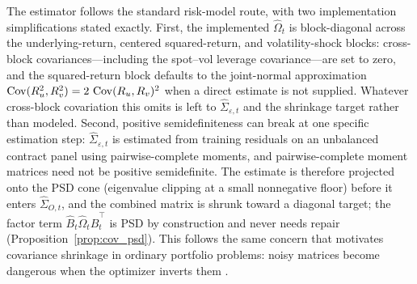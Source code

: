 The estimator follows the standard risk-model route, with two implementation
simplifications stated exactly. First, the implemented \(\widehat\Omega_t\) is
block-diagonal across the underlying-return, centered squared-return, and volatility-shock
blocks: cross-block covariances---including the spot--vol leverage covariance---are set to
zero, and the squared-return block defaults to the joint-normal approximation
\(\operatorname{Cov}(R_u^2,R_v^2)=2\,\operatorname{Cov}(R_u,R_v)^2\) when a direct estimate is not supplied. Whatever
cross-block covariation this omits is left to \(\widehat\Sigma_{\varepsilon,t}\) and the
shrinkage target rather than modeled. Second, positive semidefiniteness can break at one
specific estimation step: \(\widehat\Sigma_{\varepsilon,t}\) is estimated from training
residuals on an unbalanced contract panel using pairwise-complete moments, and
pairwise-complete moment matrices need not be positive semidefinite. The estimate is
therefore projected onto the PSD cone (eigenvalue clipping at a small nonnegative floor)
before it enters \(\widehat\Sigma_{O,t}\), and the combined matrix is shrunk toward a
diagonal target; the factor term \(\widehat B_t\widehat\Omega_t\widehat B_t^\top\) is PSD
by construction and never needs repair (Proposition~\ref{prop:cov_psd}). This follows the
same concern that motivates covariance shrinkage in ordinary portfolio problems: noisy
matrices become dangerous when the optimizer inverts them \citep{ledoitwolf2004}.
